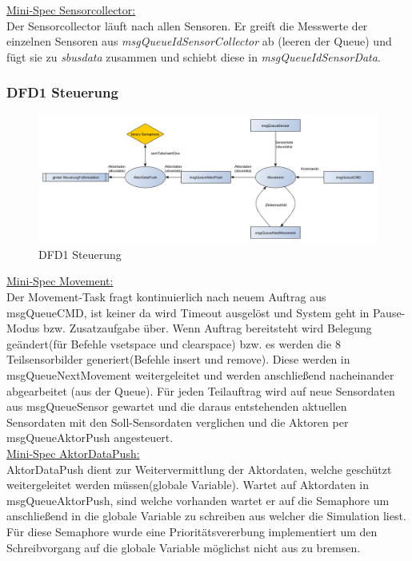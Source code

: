 \underline{Mini-Spec Sensorcollector:}\\
Der Sensorcollector läuft nach allen Sensoren. Er  greift die Messwerte der einzelnen Sensoren aus \textit{msgQueueIdSensorCollector} ab (leeren der Queue) und fügt sie zu \textit{sbusdata} zusammen und schiebt diese in \textit{msgQueueIdSensorData}.\\ 


\subsubsection{DFD1 Steuerung}
\begin{figure}[H]
	\centering
  \includegraphics[width=\textwidth]{DFD/dfd1_steuerung.png}
	\caption{DFD1 Steuerung}
	\label{fig3}
\end{figure}

\underline{Mini-Spec Movement:}\\
Der Movement-Task fragt kontinuierlich nach neuem Auftrag aus msgQueueCMD, ist keiner da wird Timeout ausgelöst und System geht in Pause-Modus bzw. Zusatzaufgabe über. Wenn Auftrag bereitsteht wird Belegung geändert(für Befehle vsetspace und clearspace) bzw. es werden die 8 Teilsensorbilder generiert(Befehle insert und remove). Diese werden in msgQueueNextMovement weitergeleitet und werden anschließend nacheinander abgearbeitet (aus der Queue). Für jeden Teilauftrag wird auf neue Sensordaten aus msgQueueSensor gewartet und die daraus entstehenden aktuellen Sensordaten mit den Soll-Sensordaten verglichen und die Aktoren per msgQueueAktorPush angesteuert. \\

\underline{Mini-Spec AktorDataPush:}\\
AktorDataPush dient zur Weitervermittlung der Aktordaten, welche geschützt weitergeleitet werden müssen(globale Variable).
Wartet auf Aktordaten in msgQueueAktorPush, sind welche vorhanden wartet er auf die Semaphore um anschließend in die globale Variable zu schreiben aus welcher die Simulation liest. Für diese Semaphore wurde eine Prioritätsvererbung implementiert um den Schreibvorgang auf die globale Variable möglichst nicht aus zu bremsen. \\